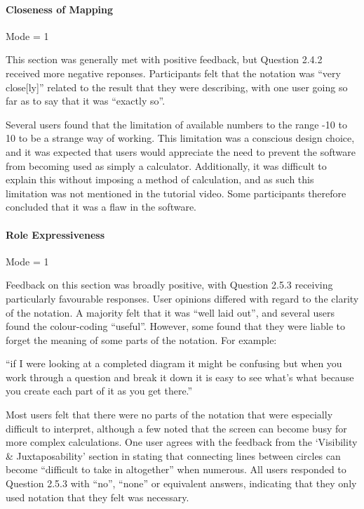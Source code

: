 \documentclass[12pt,twoside,notitlepage,xetex]{report}
\begin{document}
\paragraph{Closeness of Mapping}\hfill

Mode = 1

This section was generally met with positive feedback, but Question 2.4.2 received more negative reponses.  Participants felt that the notation was ``very close[ly]'' related to the result that they were describing, with one user going so far as to say that it was ``exactly so''.

Several users found that the limitation of available numbers to the range -10 to 10 to be a strange way of working.  This limitation was a conscious design choice, and it was expected that users would appreciate the need to prevent the software from becoming used as simply a calculator.  Additionally, it was difficult to explain this without imposing a method of calculation, and as such this limitation was not mentioned in the tutorial video.  Some participants therefore concluded that it was a flaw in the software.

\paragraph{Role Expressiveness}\hfill

Mode = 1

Feedback on this section was broadly positive, with Question 2.5.3 receiving particularly favourable responses.  User opinions differed with regard to the clarity of the notation.  A majority felt that it was ``well laid out'', and several users found the colour-coding ``useful''.  However, some found that they were liable to forget the meaning of some parts of the notation.  For example:
\begin{center}
\parbox[c]{\textwidth-2cm}{
\small
``if I were looking at a completed diagram it might be confusing but when you work through a question and break it down it is easy to see what's what because you create each part of it as you get there.''
}
\end{center}

Most users felt that there were no parts of the notation that were especially difficult to interpret, although a few noted that the screen can become busy for more complex calculations.  One user agrees with the feedback from the `Visibility \& Juxtaposability' section in stating that connecting lines between circles can become ``difficult to take in altogether'' when numerous.  All users responded to Question 2.5.3 with ``no'', ``none'' or equivalent answers, indicating that they only used notation that they felt was necessary.
\end{document}
